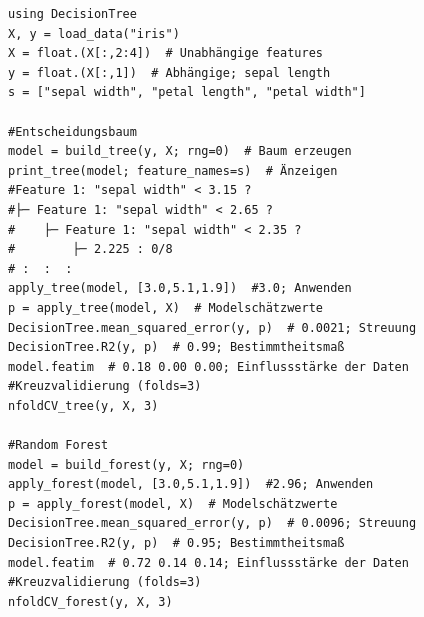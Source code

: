 \documentclass[10pt,twocolumn]{scrartcl}
\begin{document}
\begin{lstlisting}
using DecisionTree
X, y = load_data("iris")
X = float.(X[:,2:4])  # Unabhängige features
y = float.(X[:,1])  # Abhängige; sepal length
s = ["sepal width", "petal length", "petal width"]

#Entscheidungsbaum
model = build_tree(y, X; rng=0)  # Baum erzeugen
print_tree(model; feature_names=s)  # Änzeigen
#Feature 1: "sepal width" < 3.15 ?
#├─ Feature 1: "sepal width" < 2.65 ?
#    ├─ Feature 1: "sepal width" < 2.35 ?
#        ├─ 2.225 : 0/8
# :  :  :
apply_tree(model, [3.0,5.1,1.9])  #3.0; Anwenden
p = apply_tree(model, X)  # Modelschätzwerte
DecisionTree.mean_squared_error(y, p)  # 0.0021; Streuung
DecisionTree.R2(y, p)  # 0.99; Bestimmtheitsmaß
model.featim  # 0.18 0.00 0.00; Einflussstärke der Daten
#Kreuzvalidierung (folds=3)
nfoldCV_tree(y, X, 3)

#Random Forest
model = build_forest(y, X; rng=0)
apply_forest(model, [3.0,5.1,1.9])  #2.96; Anwenden
p = apply_forest(model, X)  # Modelschätzwerte
DecisionTree.mean_squared_error(y, p)  # 0.0096; Streuung
DecisionTree.R2(y, p)  # 0.95; Bestimmtheitsmaß
model.featim  # 0.72 0.14 0.14; Einflussstärke der Daten
#Kreuzvalidierung (folds=3)
nfoldCV_forest(y, X, 3)
\end{lstlisting}

\end{document}
